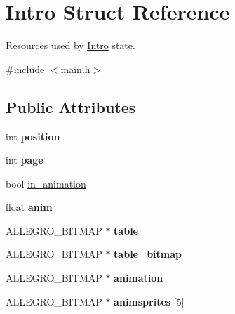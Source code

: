 \hypertarget{structIntro}{\section{\-Intro \-Struct \-Reference}
\label{structIntro}
}


\-Resources used by \hyperlink{structIntro}{\-Intro} state.  




{\ttfamily \#include $<$main.\-h$>$}

\subsection*{\-Public \-Attributes}
\begin{DoxyCompactItemize}
\item 
\hypertarget{structIntro_a5c266b2590d4304f92fd3bad033f4375}{int {\bfseries position}}\label{structIntro_a5c266b2590d4304f92fd3bad033f4375}

\item 
\hypertarget{structIntro_aaea1b2d24c0c9a5437c59d727c79ebd1}{int {\bfseries page}}\label{structIntro_aaea1b2d24c0c9a5437c59d727c79ebd1}

\item 
bool \hyperlink{structIntro_a2876fd8a7bfd940c3936eb6445984a22}{in\-\_\-animation}
\item 
\hypertarget{structIntro_a7bac02ef374847f0efbe638892cb401f}{float {\bfseries anim}}\label{structIntro_a7bac02ef374847f0efbe638892cb401f}

\item 
\hypertarget{structIntro_a342227f3940dba9ed6b5d3bb4579fd48}{\-A\-L\-L\-E\-G\-R\-O\-\_\-\-B\-I\-T\-M\-A\-P $\ast$ {\bfseries table}}\label{structIntro_a342227f3940dba9ed6b5d3bb4579fd48}

\item 
\hypertarget{structIntro_a77ea358d1f44d69e5477f5dedfc9fd2b}{\-A\-L\-L\-E\-G\-R\-O\-\_\-\-B\-I\-T\-M\-A\-P $\ast$ {\bfseries table\-\_\-bitmap}}\label{structIntro_a77ea358d1f44d69e5477f5dedfc9fd2b}

\item 
\hypertarget{structIntro_a313aec692ca43eb77fb81986d377c073}{\-A\-L\-L\-E\-G\-R\-O\-\_\-\-B\-I\-T\-M\-A\-P $\ast$ {\bfseries animation}}\label{structIntro_a313aec692ca43eb77fb81986d377c073}

\item 
\hypertarget{structIntro_ae89a2ad7dfed9e06a558a5f92bba55bc}{\-A\-L\-L\-E\-G\-R\-O\-\_\-\-B\-I\-T\-M\-A\-P $\ast$ {\bfseries animsprites} \mbox{[}5\mbox{]}}\label{structIntro_ae89a2ad7dfed9e06a558a5f92bba55bc}


\end{DoxyCompactItemize}
